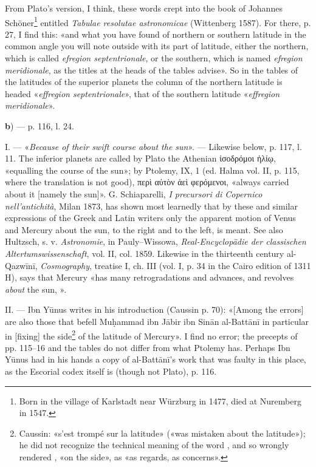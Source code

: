 \documentclass[11pt]{article}
\newcommand{\Pg}[1]{\marginpar{\footnotesize\color{gray}#1}}
\begin{document}
\par From Plato's version, I think, these words crept into the book of Johannes Schöner\footnote{Born in the village of Karlstadt near Würzburg in 1477, died at Nuremberg in 1547.} entitled \emph{Tabulae resolutae astronomicae} (Wittenberg 1587). For there, p. 27, I find this: «and what you have found of northern or southern latitude in the common angle you will note outside with its part of latitude, either the northern, which is called \emph{efregion septentrionale}, or the southern, which is named \emph{efregion meridionale}, as the titles at the heads of the tables advise». So in the tables of the latitudes of the superior planets the column of the northern latitude is headed «\emph{effregion septentrionale}», that of the southern latitude «\emph{effregion meridionale}».\par
\par\begin{center}\Pg{I 283}\textbf{b}) — p. 116, l. 24.\end{center}
\par I. — «\emph{Because of their swift course about the sun}». — Likewise below, p. 117, l. 11. The inferior planets are called by Plato the Athenian {\greekfont ἰσοδρόμοι ἡλίῳ}, «equalling the course of the sun»; by Ptolemy, IX, 1 (ed. Halma vol. II, p. 115, where the translation is not good), {\greekfont περὶ αὐτὸν ἀεὶ φερόμενοι}, «always carried about it [namely the sun]». G. Schiaparelli, \emph{I precursori di Copernico nell’antichità}, Milan 1873, has shown most learnedly that by these and similar expressions of the Greek and Latin writers only the apparent motion of Venus and Mercury about the sun, to the right and to the left, is meant. See also Hultzsch, s. v. \emph{Astronomie}, in Pauly–Wissowa, \emph{Real-Encyclopädie der classischen Altertumswissenschaft}, vol. II, col. 1859. Likewise in the thirteenth century al-Qazwīnī, \emph{Cosmography}, treatise I, ch. III (vol. I, p. 34 in the Cairo edition of 1311 H), says that Mercury «has many retrogradations and advances, and revolves \emph{about} the sun, ».\par
\par II. — Ibn Yūnus writes in his introduction (Caussin p. 70): «[Among the errors] are also those that befell Muḥammad ibn Jābir ibn Sinān al-Battānī in particular in [fixing] the side\footnote{Caussin: «s’est trompé sur la latitude» («was mistaken about the latitude»); he did not recognize the technical meaning of the word , and so wrongly rendered , «on the side», as «as regards, as concerns».} of the latitude of Mercury». I find no error; the precepts of pp. 115–16 and the tables do not differ from what Ptolemy has. Perhaps Ibn Yūnus had in his hands a copy of al-Battānī's work that was faulty in this place, as the Escorial codex itself is (though not Plato), p. 116.\par
\end{document}
